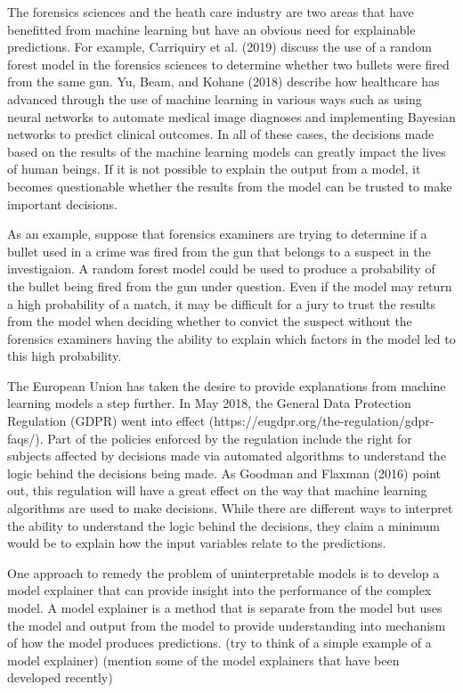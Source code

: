 \documentclass[AMS,STIX2COL]{WileyNJD-v2}
\begin{document}
The forensics sciences and the heath care industry are two areas that have benefitted from machine learning but have an obvious need for explainable predictions. For example, Carriquiry et al. (2019) discuss the use of a random forest model in the forensics sciences to determine whether two bullets were fired from the same gun. Yu, Beam, and Kohane (2018) describe how healthcare has advanced through the use of machine learning in various ways such as using neural networks to automate medical image diagnoses and implementing Bayesian networks to predict clinical outcomes. In all of these cases, the decisions made based on the results of the machine learning models can greatly impact the lives of human beings. If it is not possible to explain the output from a model, it becomes questionable whether the results from the model can be trusted to make important decisions.

As an example, suppose that forensics examiners are trying to determine if a bullet used in a crime was fired from the gun that belongs to a suspect in the investigaion. A random forest model could be used to produce a probability of the bullet being fired from the gun under question. Even if the model may return a high probability of a match, it may be difficult for a jury to trust the results from the model when deciding whether to convict the suspect without the forensics examiners having the ability to explain which factors in the model led to this high probability.

The European Union has taken the desire to provide explanations from machine learning models a step further. In May 2018, the General Data Protection Regulation (GDPR) went into effect (https://eugdpr.org/the-regulation/gdpr-faqs/). Part of the policies enforced by the regulation include the right for subjects affected by decisions made via automated algorithms to understand the logic behind the decisions being made. As Goodman and Flaxman (2016) point out, this regulation will have a great effect on the way that machine learning algorithms are used to make decisions. While there are different ways to interpret the ability to understand the logic behind the decisions, they claim a minimum would be to explain how the input variables relate to the predictions.

One approach to remedy the problem of uninterpretable models is to develop a model explainer that can provide insight into the performance of the complex model. A model explainer is a method that is separate from the model but uses the model and output from the model to provide understanding into mechanism of how the model produces predictions. (try to think of a simple example of a model explainer) (mention some of the model explainers that have been developed recently)
\end{document}
